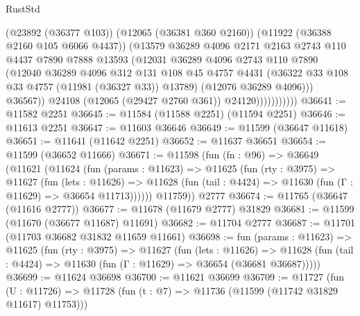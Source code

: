 \begin{lexlean}{RustStd}
\begin{coremodule}
                            (@23892 (@36377 @103))
                            (@12065 (@36381 @360 @2160))
                            (@11922 (@36388 @2160 @105 @6066 @4437))
                            (@13579
                              @36289
                              @4096
                              @2171
                              @2163
                              @2743
                              @110
                              @4437
                              @7890
                              @7888
                              @13593
                              (@12031
                                @36289
                                @4096
                                @2743
                                @110
                                @7890
                                (@12040
                                  @36289
                                  @4096
                                  @312
                                  @131
                                  @108
                                  @45
                                  @4757
                                  @4431
                                  (@36322 @33 @108 @33 @4757 (@11981 (@36327 @33)) @13789)
                                  (@12076 @36289 @4096)))
                              @36567))
                          @24108
                          (@12065 (@29427 @2760 @361))
                          @24120)))))))))))
@36641 := @11582 @2251
@36645 := @11584 (@11588 @2251) (@11594 @2251)
@36646 := @11613 @2251
@36647 := @11603 @36646
@36649 := @11599 (@36647 @11618)
@36651 := @11641 (@11642 @2251)
@36652 := @11637 @36651
@36654 := @11599 (@36652 @11666)
@36671 := @11598
    (fun (fn : @96) =>
    @36649
      (@11621
        (@11624
          (fun (params : @11623) =>
          @11625
            (fun (rty : @3975) =>
            @11627
              (fun (lets : @11626) =>
              @11628 (fun (tail : @4424) => @11630 (fun (Γ : @11629) => @36654 @11713))))))
        @11759))
    @2777
@36674 := @11765 (@36647 (@11616 @2777))
@36677 := @11678 (@11679 @2777) @31829
@36681 := @11599 (@11670 (@36677 @11687) @11691)
@36682 := @11704 @2777
@36687 := @11701 (@11703 @36682 @31832 @11659 @11661)
@36698 := fun (params : @11623) =>
  @11625
    (fun (rty : @3975) =>
    @11627
      (fun (lets : @11626) =>
      @11628 (fun (tail : @4424) => @11630 (fun (Γ : @11629) => @36654 (@36681 @36687)))))
@36699 := @11624 @36698
@36700 := @11621 @36699
@36709 := @11727
    (fun (U : @11726) => @11728 (fun (t : @7) => @11736 (@11599 (@11742 @31829 @11617) @11753)))

\end{coremodule}
\end{lexlean}
